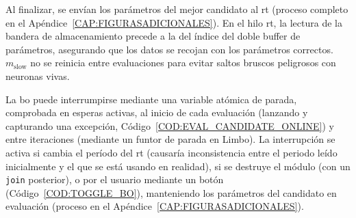 Al finalizar, se envían los parámetros del mejor candidato al \ac{rt} (proceso completo en el Apéndice~\ref{CAP:FIGURASADICIONALES}). En el hilo \ac{rt}, la lectura de la bandera de almacenamiento precede a la del índice del doble buffer de parámetros, asegurando que los datos se recojan con los parámetros correctos. \(m_{\mathrm{slow}}\) no se reinicia entre evaluaciones para evitar saltos bruscos peligrosos con neuronas vivas.

La \ac{bo} puede interrumpirse mediante una variable atómica de parada, comprobada en esperas activas, al inicio de cada evaluación (lanzando y capturando una excepción, Código~\ref{COD:EVAL_CANDIDATE_ONLINE}) y entre iteraciones (mediante un funtor de parada en Limbo). La interrupción se activa si cambia el período del \ac{rt} (causaría inconsistencia entre el periodo leído inicialmente y el que se está usando en realidad), si se destruye el módulo (con un \texttt{join} posterior), o por el usuario mediante un botón (Código~\ref{COD:TOGGLE_BO}), manteniendo los parámetros del candidato en evaluación (proceso en el Apéndice~\ref{CAP:FIGURASADICIONALES}).
